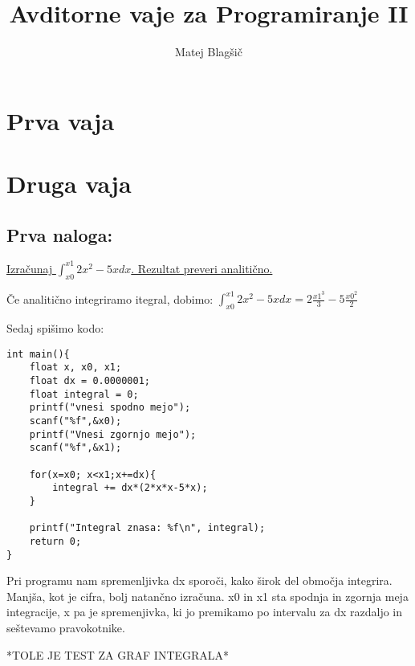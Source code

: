 \documentclass[a4paper, 12pt]{article}
\title{Avditorne vaje za Programiranje II}
\author{Matej Blagšič}
\begin{document}


	
	
	\maketitle
	\thispagestyle{empty}
	\pagebreak
	\setcounter{page}{1}
	\tableofcontents
	\pagebreak

\section{Prva vaja}

\section{Druga vaja}
\subsection*{Prva naloga:}

\underline{Izračunaj $\int_{x0}^{x1}2x^2-5x dx$. Rezultat preveri analitično.}	\

Če analitično integriramo itegral, dobimo: $\int_{x0}^{x1}2x^2-5x dx = 2\frac{x1^3}3-5\frac{x0^2}2$\

Sedaj spišimo kodo:
\begin{lstlisting}
int main(){
	float x, x0, x1;
	float dx = 0.0000001;
	float integral = 0;
	printf("vnesi spodno mejo");
	scanf("%f",&x0);
	printf("Vnesi zgornjo mejo");
	scanf("%f",&x1);

	for(x=x0; x<x1;x+=dx){
		integral += dx*(2*x*x-5*x);
	}

	printf("Integral znasa: %f\n", integral);
	return 0;
}
\end{lstlisting}
Pri programu nam spremenljivka dx sporoči, kako širok del območja integrira. Manjša, kot je cifra, bolj natančno izračuna. x0 in x1 sta spodnja in zgornja meja integracije, x pa je spremenjivka, ki jo premikamo po intervalu za dx razdaljo in seštevamo pravokotnike.
	

*TOLE JE TEST ZA GRAF INTEGRALA*
\hskip 5pt


	
	
	
	
	
	
	
	
\end{document}
